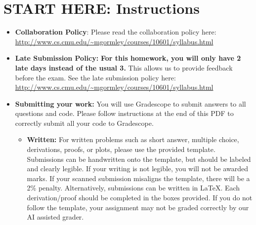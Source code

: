 \documentclass[11pt,addpoints,answers]{exam}
\begin{document}
\section*{START HERE: Instructions}
\begin{itemize}

\item \textbf{Collaboration Policy}: Please read the collaboration policy here: \url{http://www.cs.cmu.edu/~mgormley/courses/10601/syllabus.html}

\item\textbf{Late Submission Policy:} \textbf{For this homework, you will only have 2 late days instead of the usual 3.} This allows us to provide feedback before the exam. See the late submission policy here: \url{http://www.cs.cmu.edu/~mgormley/courses/10601/syllabus.html}

\item\textbf{Submitting your work:} You will use Gradescope to submit
  answers to all questions and code. Please
  follow instructions at the end of this PDF to correctly submit all your code to Gradescope.

  \begin{itemize}
    

    
   \item \textbf{Written:} For written problems such as short answer, multiple choice, derivations, proofs, or plots, please use the provided template. Submissions can be handwritten onto the template, but should be labeled and clearly legible. If your writing is not legible, you will not be awarded marks. If your scanned submission misaligns the template, there will be a 2\% penalty. Alternatively, submissions can be written in LaTeX. 
   Each derivation/proof should be completed in the boxes provided. If you do not follow the template, your assignment may not be graded correctly by our AI assisted grader.
  \end{itemize}

\end{itemize}\clearpage
\end{document}
